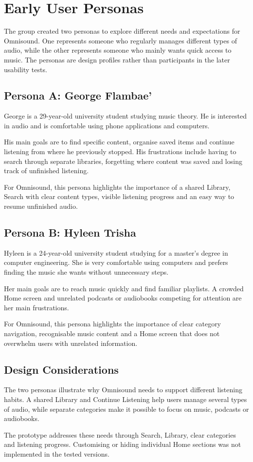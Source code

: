 \chapter{Early User Personas}
\label{app:personas}

The group created two personas to explore different needs and expectations for Omnisound. One represents someone who regularly manages different types of audio, while the other represents someone who mainly wants quick access to music. The personas are design profiles rather than participants in the later usability tests.

\section{Persona A: George Flambae'}

George is a 29-year-old university student studying music theory. He is interested in audio and is comfortable using phone applications and computers.

His main goals are to find specific content, organise saved items and continue listening from where he previously stopped. His frustrations include having to search through separate libraries, forgetting where content was saved and losing track of unfinished listening.

For Omnisound, this persona highlights the importance of a shared Library, Search with clear content types, visible listening progress and an easy way to resume unfinished audio.

\section{Persona B: Hyleen Trisha}

Hyleen is a 24-year-old university student studying for a master's degree in computer engineering. She is very comfortable using computers and prefers finding the music she wants without unnecessary steps.

Her main goals are to reach music quickly and find familiar playlists. A crowded Home screen and unrelated podcasts or audiobooks competing for attention are her main frustrations.

For Omnisound, this persona highlights the importance of clear category navigation, recognisable music content and a Home screen that does not overwhelm users with unrelated information.

\section{Design Considerations}

The two personas illustrate why Omnisound needs to support different listening habits. A shared Library and Continue Listening help users manage several types of audio, while separate categories make it possible to focus on music, podcasts or audiobooks.

The prototype addresses these needs through Search, Library, clear categories and listening progress. Customising or hiding individual Home sections was not implemented in the tested versions.
